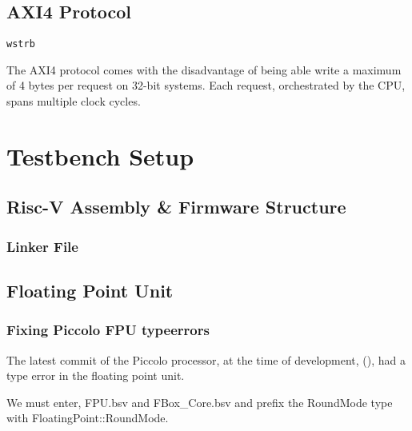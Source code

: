 \documentclass[a4paper,9pt]{report}
\begin{document}
\subsection{AXI4 Protocol}
\texttt{wstrb}

The AXI4 protocol comes with the disadvantage of being able write a maximum of 4
bytes per request on 32-bit systems. Each request, orchestrated by the CPU,
spans multiple clock cycles.





\section{Testbench Setup}
\subsection{Risc-V Assembly \& Firmware Structure}
\subsubsection{Linker File}

\subsection{Floating Point Unit}
\subsubsection{Fixing Piccolo FPU typeerrors}
The latest commit of the Piccolo processor, at the time of development, (), had
a type error in the floating point unit. 

We must enter, FPU.bsv and FBox\_Core.bsv and prefix the RoundMode type with FloatingPoint::RoundMode.



\end{document}
